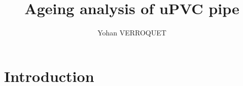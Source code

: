 \documentclass{article}
\title{Ageing analysis of uPVC pipe}
\author{Yohan VERROQUET}
\begin{document}
\maketitle
\newpage
\tableofcontents
\listoffigures           %
\listoftables            %
\newpage

\section{Introduction}
\end{document}
